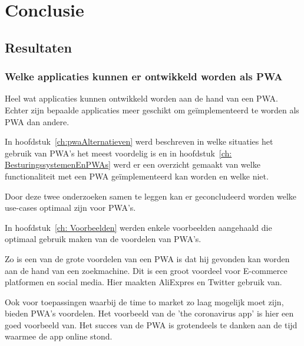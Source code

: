 \chapter{Conclusie}
\label{ch:conclusie}

	  

\section{Resultaten}

	\subsection{Welke applicaties kunnen er ontwikkeld worden als PWA}
	
		Heel wat applicaties kunnen ontwikkeld worden aan de hand van een PWA. Echter zijn bepaalde applicaties meer geschikt om geïmplementeerd te worden als PWA dan andere.
		
		In hoofdstuk~\ref{ch:pwaAlternatieven} werd beschreven in welke situaties het gebruik van PWA's het meest voordelig is en in hoofdstuk~\ref{ch: BesturingssystemenEnPWAs} werd er een overzicht gemaakt van welke functionaliteit met een PWA geïmplementeerd kan worden en welke niet.
		
		Door deze twee onderzoeken samen te leggen kan er geconcludeerd worden welke use-cases optimaal zijn voor PWA's.
		
		In hoofdstuk~\ref{ch: Voorbeelden} werden enkele voorbeelden aangehaald die optimaal gebruik maken van de voordelen van PWA's.
			
		Zo is een van de grote voordelen van een PWA is dat hij gevonden kan worden aan de hand van een zoekmachine. Dit is een groot voordeel voor E-commerce platformen en social media. Hier maakten AliExpres en Twitter gebruik van.
		
		Ook voor toepassingen waarbij de time to market zo laag mogelijk moet zijn, bieden PWA's voordelen. Het voorbeeld van de 'the coronavirus app' is hier een goed voorbeeld van. Het succes van de PWA is grotendeels te danken aan de tijd waarmee de app online stond.


